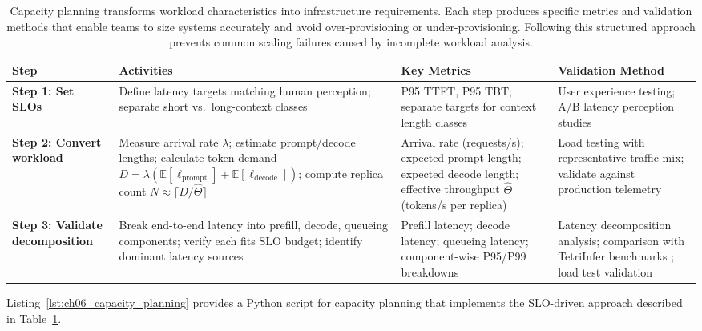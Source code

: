 \begin{table}[t]
\centering
\small
\caption{Capacity planning transforms workload characteristics into infrastructure requirements. Each step produces specific metrics and validation methods that enable teams to size systems accurately and avoid over-provisioning or under-provisioning. Following this structured approach prevents common scaling failures caused by incomplete workload analysis.}
\label{tab:ch06_capacity_planning}
\setlength{\tabcolsep}{6pt}
\renewcommand{\arraystretch}{1.3}
\begin{tabularx}{\linewidth}{@{}>{\raggedright\arraybackslash}p{2.5cm}>{\raggedright\arraybackslash}X>{\raggedright\arraybackslash}X>{\raggedright\arraybackslash}X@{}}
\toprule
\rowcolor{gray!15}
\textbf{Step} & \textbf{Activities} & \textbf{Key Metrics} & \textbf{Validation Method} \\
\midrule
\textbf{Step 1: Set SLOs} & Define latency targets matching human perception; separate short vs.\ long-context classes & P95 TTFT, P95 TBT; separate targets for context length classes & User experience testing; A/B latency perception studies \\
\addlinespace[2pt]
\textbf{Step 2: Convert workload} & Measure arrival rate $\lambda$; estimate prompt/decode lengths; calculate token demand $D = \lambda(\mathbb{E}[\ell_{\text{prompt}}] + \mathbb{E}[\ell_{\text{decode}}])$; compute replica count $N \approx \lceil D/\hat{\Theta} \rceil$ & Arrival rate (requests/s); expected prompt length; expected decode length; effective throughput $\hat{\Theta}$ (tokens/s per replica) & Load testing with representative traffic mix; validate against production telemetry \\
\addlinespace[2pt]
\textbf{Step 3: Validate decomposition} & Break end-to-end latency into prefill, decode, queueing components; verify each fits SLO budget; identify dominant latency sources & Prefill latency; decode latency; queueing latency; component-wise P95/P99 breakdowns & Latency decomposition analysis; comparison with TetriInfer benchmarks \cite{tetriinfer2023}; load test validation \\
\bottomrule
\end{tabularx}
\end{table}

Listing~\ref{lst:ch06_capacity_planning} provides a Python script for capacity planning that implements the SLO-driven approach described in Table~\ref{tab:ch06_capacity_planning}.

